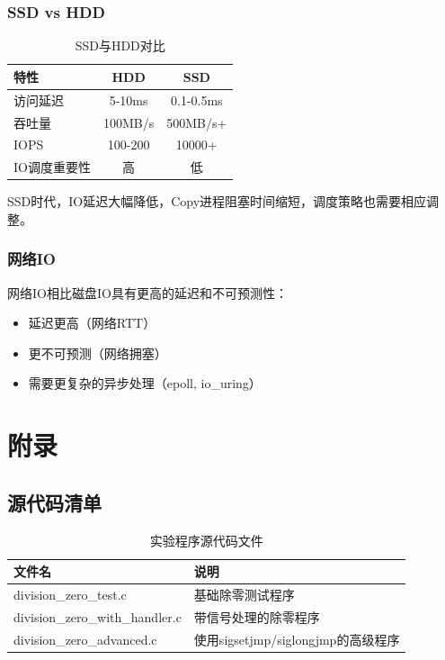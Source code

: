 \documentclass[UTF8,a4paper,12pt]{ctexart}
\begin{document}
\subsubsection{SSD vs HDD}

\begin{table}[H]
\centering
\caption{SSD与HDD对比}
\begin{tabular}{lcc}
\toprule
\textbf{特性} & \textbf{HDD} & \textbf{SSD} \\
\midrule
访问延迟 & 5-10ms & 0.1-0.5ms \\
吞吐量 & 100MB/s & 500MB/s+ \\
IOPS & 100-200 & 10000+ \\
IO调度重要性 & 高 & 低 \\
\bottomrule
\end{tabular}
\end{table}

SSD时代，IO延迟大幅降低，Copy进程阻塞时间缩短，调度策略也需要相应调整。

\subsubsection{网络IO}

网络IO相比磁盘IO具有更高的延迟和不可预测性：
\begin{itemize}
    \item 延迟更高（网络RTT）
    \item 更不可预测（网络拥塞）
    \item 需要更复杂的异步处理（epoll, io\_uring）
\end{itemize}

\newpage

\section{附录}

\subsection{源代码清单}

\begin{table}[H]
\centering
\caption{实验程序源代码文件}
\begin{tabular}{lp{8cm}}
\toprule
\textbf{文件名} & \textbf{说明} \\
\midrule
division\_zero\_test.c & 基础除零测试程序 \\
division\_zero\_with\_handler.c & 带信号处理的除零程序 \\
division\_zero\_advanced.c & 使用sigsetjmp/siglongjmp的高级程序 \\
\bottomrule
\end{tabular}
\end{table}
\end{document}
